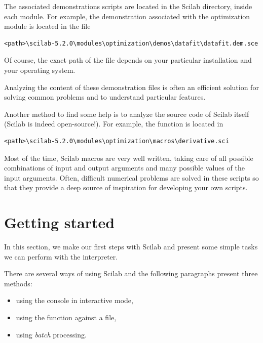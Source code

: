 The associated demonstrations scripts are located in the 
Scilab directory, inside each module. For example, the demonstration
associated with the optimization module is located in the 
file 
\begin{center}
\begin{small}
\begin{verbatim}
<path>\scilab-5.2.0\modules\optimization\demos\datafit\datafit.dem.sce
\end{verbatim}
\end{small}
\end{center}
Of course, the exact path of the file depends on your particular
installation and your operating system.

Analyzing the content of these demonstration files is often 
an efficient solution for solving common problems and to 
understand particular features.

Another method to find some help is to analyze the source code 
of Scilab itself (Scilab is indeed open-source!). 
For example, the  function is located in 
\begin{center}
\begin{small}
\begin{verbatim}
<path>\scilab-5.2.0\modules\optimization\macros\derivative.sci
\end{verbatim}
\end{small}
\end{center}

Most of the time, Scilab macros are very well written, taking care 
of all possible combinations of input and output 
arguments and many possible values of the input arguments. 
Often, difficult numerical problems are solved in these scripts so that 
they provide a deep source of inspiration for developing your 
own scripts.


\section{Getting started}

In this section, we make our first steps with Scilab and present 
some simple tasks we can perform with the interpreter.

There are several ways of using Scilab and the following paragraphs
present three methods:
\begin{itemize}
\item using the console in interactive mode,
\item using the  function against a file,
\item using \emph{batch} processing.
\end{itemize}

